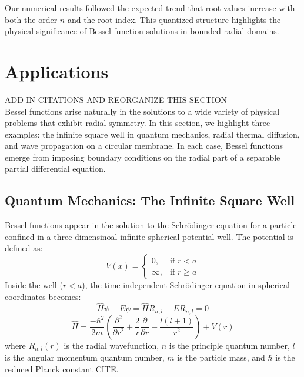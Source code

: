 \documentclass[linenumbers, twocolumn]{aastex631}
\begin{document}
\noindent Our numerical results followed the expected trend that root values
increase with both the order $n$ and the root index. This quantized structure
highlights the physical significance of Bessel function solutions in bounded
radial domains.\\


\section{Applications} \label{sec:applications}

ADD IN CITATIONS AND REORGANIZE THIS SECTION\\

Bessel functions arise naturally in the solutions to a wide variety of physical
problems that exhibit radial symmetry. In this section, we highlight three
examples: the infinite square well in quantum mechanics, radial thermal
diffusion, and wave propagation on a circular membrane. In each case, Bessel
functions emerge from imposing boundary conditions on the radial part of a 
separable partial differential equation.\\

\subsection{Quantum Mechanics: The Infinite Square Well}

Bessel functions appear in the solution to the Schrödinger equation for a
particle confined in a three-dimensinoal infinite spherical potential well.
The potential is defined as:
\begin{equation}
    V(x)=
    \begin{cases}
        0, &\text{if }r < a\\
        \infty, &\text{if }r\geq a
    \end{cases}
\end{equation}
\noindent Inside the well ($r < a$), the time-independent Schrödinger equation in
spherical coordinates becomes:
\begin{equation}
    \hat{H}\psi-E\psi=\hat{H}R_{n,l}-ER_{n,l}=0
\end{equation}
\begin{equation}
    \hat{H}=\frac{-\hbar ^2}{2m}\left(\frac{\partial^2}{\partial r^2} + \frac{2}{r} \frac{\partial}{\partial r} - \frac{l(l+1)}{r^2}\right) +V(r)
\end{equation}
\noindent where $R_{n,l}(r)$ is the radial wavefunction, $n$ is the principle
quantum number, $l$ is the angular momentum quantum number, $m$ is the
particle mass, and $\hbar$ is the reduced Planck constant CITE.
\end{document}
